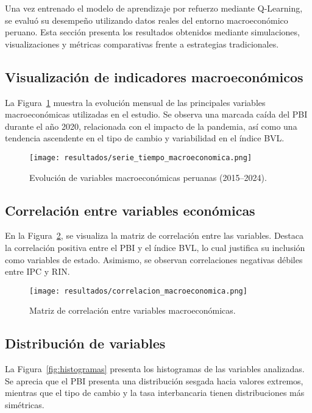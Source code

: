 \documentclass[conference]{IEEEtran}
\begin{document}
	Una vez entrenado el modelo de aprendizaje por refuerzo mediante Q-Learning, se evaluó su desempeño utilizando datos reales del entorno macroeconómico peruano. Esta sección presenta los resultados obtenidos mediante simulaciones, visualizaciones y métricas comparativas frente a estrategias tradicionales.
	
	\subsection{Visualización de indicadores macroeconómicos}
	
	La Figura~\ref{fig:serie_macro} muestra la evolución mensual de las principales variables macroeconómicas utilizadas en el estudio. Se observa una marcada caída del PBI durante el año 2020, relacionada con el impacto de la pandemia, así como una tendencia ascendente en el tipo de cambio y variabilidad en el índice BVL.
	
	\begin{figure}[ht]
		\centering
		\texttt{[image: resultados/serie\_tiempo\_macroeconomica.png]}
		\caption{Evolución de variables macroeconómicas peruanas (2015--2024).}
		\label{fig:serie_macro}
	\end{figure}
	
	\subsection{Correlación entre variables económicas}
	
	En la Figura~\ref{fig:correlacion}, se visualiza la matriz de correlación entre las variables. Destaca la correlación positiva entre el PBI y el índice BVL, lo cual justifica su inclusión como variables de estado. Asimismo, se observan correlaciones negativas débiles entre IPC y RIN.
	
	\begin{figure}[ht]
		\centering
		\texttt{[image: resultados/correlacion\_macroeconomica.png]}
		\caption{Matriz de correlación entre variables macroeconómicas.}
		\label{fig:correlacion}
	\end{figure}
	
	\subsection{Distribución de variables}
	
	La Figura~\ref{fig:histogramas} presenta los histogramas de las variables analizadas. Se aprecia que el PBI presenta una distribución sesgada hacia valores extremos, mientras que el tipo de cambio y la tasa interbancaria tienen distribuciones más simétricas.
	
\end{document}
